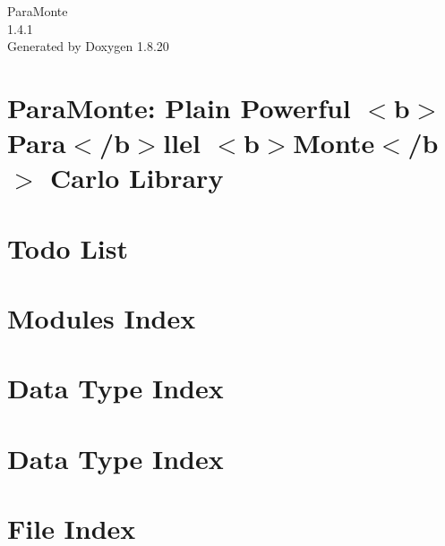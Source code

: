 \let\mypdfximage\pdfximage\def\pdfximage{\immediate\mypdfximage}\documentclass[twoside]{book}
\newcommand{\+}{\discretionary{\mbox{\scriptsize$\hookleftarrow$}}{}{}}
\newcommand{\clearemptydoublepage}{%
  \newpage{\pagestyle{empty}\cleardoublepage}%
}
\begin{document}
\hypersetup{pageanchor=false,
             bookmarksnumbered=true,
             pdfencoding=unicode
            }
\begin{titlepage}
\vspace*{7cm}
\begin{center}%
{\Large Para\+Monte \\[1ex]\large 1.\+4.\+1 }\\
\vspace*{1cm}
{\large Generated by Doxygen 1.8.20}\\
\end{center}
\end{titlepage}
\clearemptydoublepage
{}
\tableofcontents
\clearemptydoublepage
{}
\hypersetup{pageanchor=true}

\chapter{Para\+Monte\+: Plain Powerful $<$b$>$Para$<$/b$>$llel $<$b$>$Monte$<$/b$>$ Carlo Library}
\label{index}\hypertarget{index}{}
\chapter{Todo List}
\label{todo}

\chapter{Modules Index}

\chapter{Data Type Index}

\chapter{Data Type Index}

\chapter{File Index}

\end{document}
